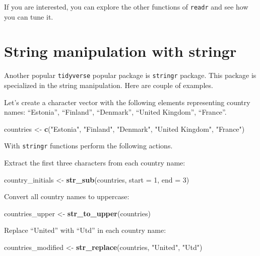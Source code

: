 \documentclass[
]{book}
\newenvironment{Shaded}{\begin{snugshade}}{\end{snugshade}}
\newcommand{\AttributeTok}[1]{\textcolor[rgb]{0.13,0.29,0.53}{#1}}
\newcommand{\DecValTok}[1]{\textcolor[rgb]{0.00,0.00,0.81}{#1}}
\newcommand{\FunctionTok}[1]{\textcolor[rgb]{0.13,0.29,0.53}{\textbf{#1}}}
\newcommand{\NormalTok}[1]{#1}
\newcommand{\OtherTok}[1]{\textcolor[rgb]{0.56,0.35,0.01}{#1}}
\newcommand{\StringTok}[1]{\textcolor[rgb]{0.31,0.60,0.02}{#1}}
\begin{document}
If you are interested, you can explore the other functions of \texttt{readr} and see how you can tune it.

\section{String manipulation with stringr}\label{string-manipulation-with-stringr}

Another popular \texttt{tidyverse} popular package is \texttt{stringr} package. This package is specialized in the string manipulation. Here are couple of examples.

Let's create a character vector with the following elements representing country names: ``Estonia'', ``Finland'', ``Denmark'', ``United Kingdom'', ``France''.

\begin{Shaded}
\begin{Highlighting}[]
\NormalTok{countries }\OtherTok{\textless{}{-}} 
  \FunctionTok{c}\NormalTok{(}\StringTok{"Estonia"}\NormalTok{, }\StringTok{"Finland"}\NormalTok{, }\StringTok{"Denmark"}\NormalTok{, }\StringTok{"United Kingdom"}\NormalTok{, }\StringTok{"France"}\NormalTok{)}
\end{Highlighting}
\end{Shaded}

With \texttt{stringr} functions perform the following actions.

Extract the first three characters from each country name:

\begin{Shaded}
\begin{Highlighting}[]
\NormalTok{country\_initials }\OtherTok{\textless{}{-}} \FunctionTok{str\_sub}\NormalTok{(countries, }\AttributeTok{start =} \DecValTok{1}\NormalTok{, }\AttributeTok{end =} \DecValTok{3}\NormalTok{)}
\end{Highlighting}
\end{Shaded}

Convert all country names to uppercase:

\begin{Shaded}
\begin{Highlighting}[]
\NormalTok{countries\_upper }\OtherTok{\textless{}{-}} \FunctionTok{str\_to\_upper}\NormalTok{(countries)}
\end{Highlighting}
\end{Shaded}

Replace ``United'' with ``Utd'' in each country name:

\begin{Shaded}
\begin{Highlighting}[]
\NormalTok{countries\_modified }\OtherTok{\textless{}{-}} \FunctionTok{str\_replace}\NormalTok{(countries, }\StringTok{"United"}\NormalTok{, }\StringTok{"Utd"}\NormalTok{)}
\end{Highlighting}
\end{Shaded}
\end{document}
